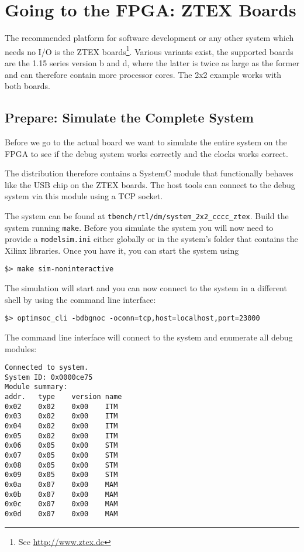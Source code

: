 \section{Going to the FPGA: ZTEX Boards}

The recommended platform for software development or any other system
which needs no I/O is the ZTEX boards\footnote{See
  \url{http://www.ztex.de}}. Various variants exist, the supported boards
are the 1.15 series version b and d, where the latter is twice as
large as the former and can therefore contain more processor cores.
The 2x2 example works with both boards.

\subsection{Prepare: Simulate the Complete System}
\label{subsection:2x2_ztex_simulate_complete_system}

Before we go to the actual board we want to simulate the entire system
on the FPGA to see if the debug system works correctly and the
clocks works correct.

The distribution therefore contains a SystemC module that functionally
behaves like the USB chip on the ZTEX boards. The host tools can
connect to the debug system via this module using a TCP socket.

The system can be found at \verb|tbench/rtl/dm/system_2x2_cccc_ztex|.
Build the system running \verb|make|. Before you simulate the system
you will now need to provide a \verb|modelsim.ini| either globally or
in the system's folder that contains the Xilinx libraries. Once you
have it, you can start the system using

\begin{lstlisting}
$> make sim-noninteractive
\end{lstlisting}

The simulation will start and you can now connect
to the system in a different shell by using the command line
interface:

\begin{lstlisting}
$> optimsoc_cli -bdbgnoc -oconn=tcp,host=localhost,port=23000
\end{lstlisting}

The command line interface will connect to the system and enumerate
all debug modules:

\begin{lstlisting}
Connected to system.
System ID: 0x0000ce75
Module summary:
addr.	type	version	name
0x02	0x02	0x00	ITM
0x03	0x02	0x00	ITM
0x04	0x02	0x00	ITM
0x05	0x02	0x00	ITM
0x06	0x05	0x00	STM
0x07	0x05	0x00	STM
0x08	0x05	0x00	STM
0x09	0x05	0x00	STM
0x0a	0x07	0x00	MAM
0x0b	0x07	0x00	MAM
0x0c	0x07	0x00	MAM
0x0d	0x07	0x00	MAM
\end{lstlisting}

